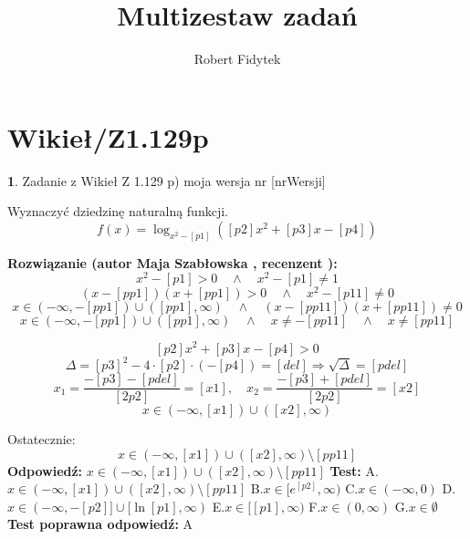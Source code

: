 \documentclass[12pt, a4paper]{article}
\title{Multizestaw zadań}
\author{Robert Fidytek}
\date{}
\theoremstyle{definition} %
\newtheorem{zad}{}
\newcommand{\kategoria}[1]{\section{#1}} %
\newcommand{\zadStart}[1]{\begin{zad}#1\newline} %
\newcommand{\zadStop}{\end{zad}}   %
\newcommand{\rozwStart}[2]{\noindent \textbf{Rozwiązanie (autor #1 , recenzent #2): }\newline} %
\newcommand{\rozwStop}{\newline}                                            %
\newcommand{\odpStart}{\noindent \textbf{Odpowiedź:}\newline}    %
\newcommand{\odpStop}{\newline}                                             %
\newcommand{\testStart}{\noindent \textbf{Test:}\newline} %
\newcommand{\testStop}{\newline} %
\newcommand{\kluczStart}{\noindent \textbf{Test poprawna odpowiedź:}\newline} %
\newcommand{\kluczStop}{\newline} %
\begin{document}
\maketitle


\kategoria{Wikieł/Z1.129p}
\zadStart{Zadanie z Wikieł Z 1.129 p) moja wersja nr [nrWersji]}

Wyznaczyć dziedzinę naturalną funkcji.
$$f(x)=\log_{x^{2}-[p1]}([p2]x^{2}+[p3]x-[p4])$$
\zadStop

\rozwStart{Maja Szabłowska}{}
$$x^{2}-[p1]>0 \quad \land \quad x^{2}-[p1]\neq 1 $$
$$(x-[pp1])(x+[pp1])>0 \quad \land \quad x^{2}-[p11]\neq0 $$
$$x\in(-\infty,-[pp1])\cup([pp1],\infty) \quad \land \quad (x-[pp11])(x+[pp11])\neq0$$
$$x\in(-\infty,-[pp1])\cup([pp1],\infty) \quad \land \quad x\neq-[pp11]\quad \land \quad x\neq[pp11]$$

$$[p2]x^{2}+[p3]x-[p4]>0$$
$$\Delta=[p3]^{2}-4\cdot[p2]\cdot(-[p4])=[del] \Rightarrow \sqrt{\Delta}=[pdel]$$
$$x_{1}=\frac{-[p3]-[pdel]}{[2p2]}=[x1], \quad x_{2}=\frac{-[p3]+[pdel]}{[2p2]}=[x2]$$
$$x\in(-\infty,[x1])\cup([x2],\infty)$$

Ostatecznie:
$$x\in(-\infty,[x1])\cup([x2],\infty)\setminus{[pp11]}$$
\rozwStop
\odpStart
$x\in(-\infty,[x1])\cup([x2],\infty)\setminus{[pp11]}$
\odpStop
\testStart
A.$x\in(-\infty,[x1])\cup([x2],\infty)\setminus{[pp11]}$
B.$x\in[e^{[p2]},\infty)$
C.$x\in(-\infty, 0)$
D.$x\in(-\infty, -[p2]] \cup [\ln[p1],\infty)$
E.$x\in[[p1],\infty)$
F.$x\in(0,\infty)$
G.$x\in\emptyset$
\testStop
\kluczStart
A
\kluczStop
\end{document}
